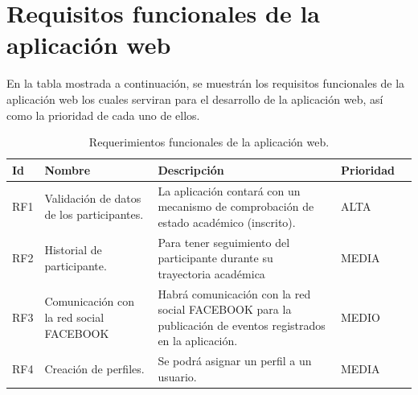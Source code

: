 \section{Requisitos funcionales de la aplicación web}
En la tabla mostrada a continuación, se muestrán los requisitos funcionales de la aplicación web los cuales serviran para el desarrollo de la aplicación web, así como la prioridad de cada uno de ellos.
\begin{table}[htbp]
	\begin{center}
		\begin{tabular}{|l|p{45mm}|p{45mm}|p{45mm}|l}
			\hline
			Id & Nombre & Descripción & Prioridad \\
			\hline 
			RF1 & Validación de datos de los participantes. & La aplicación contará con un mecanismo de comprobación de estado académico (inscrito). & ALTA \\ \hline
			RF2 & Historial de participante. & Para tener seguimiento del participante durante su trayectoria académica & MEDIA  \\ \hline
			RF3 & Comunicación con la red social FACEBOOK &Habrá comunicación con la red social FACEBOOK para la publicación de eventos registrados en la aplicación.  & MEDIO \\ \hline
			RF4 & Creación de perfiles. & Se podrá asignar un perfil a un usuario.& MEDIA \\ \hline
		\end{tabular}
		\pagebreak
		\caption{Requerimientos funcionales de la aplicación web.}
		\label{tabla:sencilla}
	\end{center}
\end{table}


